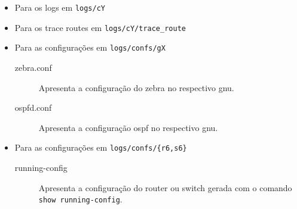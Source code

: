 \documentclass[a4paper,12pt]{article}
\begin{document}
\begin{itemize}
	\item Para os logs em \verb-logs/cY-
	\item Para os trace routes em \verb-logs/cY/trace_route-
	\item Para as configurações em \verb-logs/confs/gX-
		\begin{description}
			\item[zebra.conf] Apresenta a configuração do zebra no respectivo
				gnu.
			\item[ospfd.conf] Apresenta a configuração ospf no respectivo gnu.
		\end{description}
	\item Para as configurações em \verb-logs/confs/{r6,s6}-
		\begin{description}
			\item[running-config] Apresenta a configuração do router ou switch
				gerada com o comando \verb_show running-config_.
		\end{description}
\end{itemize}



\end{document}
